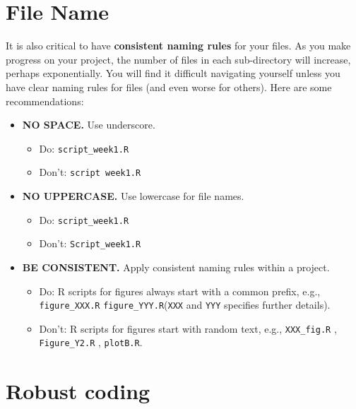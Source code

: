 \documentclass[
]{book}
\providecommand{\tightlist}{%
  \setlength{\itemsep}{0pt}\setlength{\parskip}{0pt}}
\begin{document}
\hypertarget{file-name}{%
\section{File Name}\label{file-name}}

It is also critical to have \textbf{consistent naming rules} for your files. As you make progress on your project, the number of files in each sub-directory will increase, perhaps exponentially. You will find it difficult navigating yourself unless you have clear naming rules for files (and even worse for others). Here are some recommendations:

\begin{itemize}
\tightlist
\item
  \textbf{NO SPACE.} Use underscore.

  \begin{itemize}
  \tightlist
  \item
    Do: \texttt{script\_week1.R}
  \item
    Don't: \texttt{script\ week1.R}
  \end{itemize}
\item
  \textbf{NO UPPERCASE.} Use lowercase for file names.

  \begin{itemize}
  \tightlist
  \item
    Do: \texttt{script\_week1.R}
  \item
    Don't: \texttt{Script\_week1.R}
  \end{itemize}
\item
  \textbf{BE CONSISTENT.} Apply consistent naming rules within a project.

  \begin{itemize}
  \tightlist
  \item
    Do: R scripts for figures always start with a common prefix, e.g., \texttt{figure\_XXX.R} \texttt{figure\_YYY.R}(\texttt{XXX} and \texttt{YYY} specifies further details).
  \item
    Don't: R scripts for figures start with random text, e.g., \texttt{XXX\_fig.R} , \texttt{Figure\_Y2.R} , \texttt{plotB.R}.
  \end{itemize}
\end{itemize}

\hypertarget{robust-coding}{%
\section{Robust coding}\label{robust-coding}}
\end{document}
